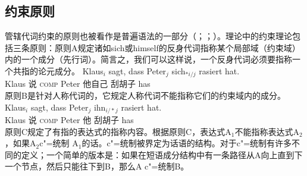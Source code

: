 \subsection{约束原则}

管辖代词约束的原则也被看作是普遍语法的一部分（\citealp[]{Chomsky98a-u}；\citealp*[]{CTK2009a}；\citealp[]{Rizzi2009a}）。\gbc 理论中的约束理论包括三条原则：原则A规定诸如sich或himself的反身代词指称某个局部域（约束域）内的一个成分（先行词）。简言之，我们可以这样说，一个反身代词必须要指称一个共指的论元成分。
\ea
\gll Klaus$_i$ sagt, dass Peter$_j$ sich$_{*i/j}$ rasiert hat.\\
     Klaus     说 \textsc{comp} Peter 他自己 刮胡子 has\\
\z
原则B是针对人称代词的，它规定人称代词不能指称它们的约束域内的成分。
\ea
\gll Klaus$_i$ sagt, dass Peter$_j$ ihn$_{i/*j}$ rasiert hat.\\
	 Klaus 说 \textsc{comp} Peter 他 刮胡子 has\\ 
\z
原则C规定了有指的表达式的指称内容。根据原则C，表达式A$_1$不能指称表达式A$_2$，如果A$_2$c"=统制 A$_1$的话。c"=统制被界定为话语的结构。对于c"=统制有许多不同的定义；一个简单的版本是：如果在短语成分结构中有一条路径从A向上直到下一个节点，然后只能往下到B，那么A c"=统制B。


